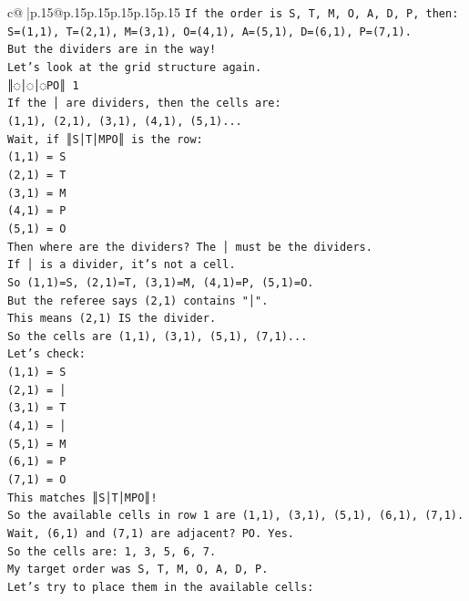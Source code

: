 \documentclass{article}
\begin{document}
{\begin{supertabular}{c@{$\;$}|p{.15\linewidth}@{}p{.15\linewidth}p{.15\linewidth}p{.15\linewidth}p{.15\linewidth}p{.15\linewidth}}
{{{\texttt{If the order is S, T, M, O, A, D, P, then:} \\
\texttt{S=(1,1), T=(2,1), M=(3,1), O=(4,1), A=(5,1), D=(6,1), P=(7,1).} \\
\texttt{But the dividers are in the way!} \\
\texttt{Let's look at the grid structure again.} \\
\texttt{║◌│◌│◌PO║ 1} \\
\texttt{If the │ are dividers, then the cells are:} \\
\texttt{(1,1), (2,1), (3,1), (4,1), (5,1)...} \\
\texttt{Wait, if ║S│T│MPO║ is the row:} \\
\texttt{(1,1) = S} \\
\texttt{(2,1) = T} \\
\texttt{(3,1) = M} \\
\texttt{(4,1) = P} \\
\texttt{(5,1) = O} \\
\texttt{Then where are the dividers? The │ must be the dividers.} \\
\texttt{If │ is a divider, it's not a cell.} \\
\texttt{So (1,1)=S, (2,1)=T, (3,1)=M, (4,1)=P, (5,1)=O.} \\
\texttt{But the referee says (2,1) contains "│".} \\
\texttt{This means (2,1) IS the divider.} \\
\texttt{So the cells are (1,1), (3,1), (5,1), (7,1)...} \\
\texttt{Let's check:} \\
\texttt{(1,1) = S} \\
\texttt{(2,1) = │} \\
\texttt{(3,1) = T} \\
\texttt{(4,1) = │} \\
\texttt{(5,1) = M} \\
\texttt{(6,1) = P} \\
\texttt{(7,1) = O} \\
\texttt{This matches ║S│T│MPO║!} \\
\texttt{So the available cells in row 1 are (1,1), (3,1), (5,1), (6,1), (7,1).} \\
\texttt{Wait, (6,1) and (7,1) are adjacent? PO. Yes.} \\
\texttt{So the cells are: 1, 3, 5, 6, 7.} \\
\texttt{My target order was S, T, M, O, A, D, P.} \\
\texttt{Let's try to place them in the available cells:} \\
}}}
\end{supertabular}}
\end{document}
